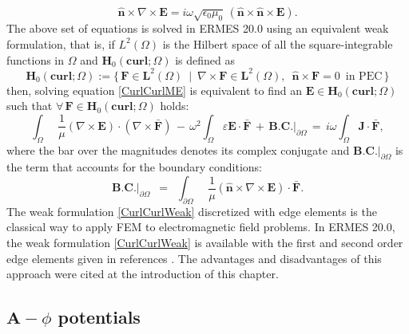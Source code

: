 \begin{equation}\label{BC-1stABC}
	\mathbf{\hat{n}}\times\nabla\times\mathbf{E} = i\omega\sqrt{\epsilon_{0}\mu_{0}}\, (\mathbf{\hat{n}}\times\mathbf{\hat{n}}\times\mathbf{E}).
\end{equation}
The above set of equations is solved in ERMES 20.0 using an equivalent weak formulation, that is, if $L^{2}(\Omega)$ is the Hilbert space of all the square-integrable functions in $\Omega$ and $\mathbf{H}_{0}(\mathbf{curl};\Omega)$ is defined as
\begin{equation}\label{HCurl}
	\mathbf{H}_{0}(\mathbf{curl};\Omega) := \{\,\mathbf{F}\in \mathbf{L}^{2}(\Omega)\enspace|\enspace\nabla\times \mathbf{F} \in \mathbf{L}^{2}(\Omega),\enspace \mathbf{\hat{n}}\times\mathbf{F} = 0\enspace\text{in PEC}\,\}
\end{equation}
then, solving equation \eqref{CurlCurlME} is equivalent to find an $\mathbf{E} \in \mathbf{H}_{0}(\mathbf{curl};\Omega)$ such
that $\forall\,\mathbf{F} \in \mathbf{H}_{0}(\mathbf{curl};\Omega)$ holds:
\begin{equation}\label{CurlCurlWeak}
	\int_{\Omega}\enspace\frac{1}{\mu}(\nabla\times\mathbf{E})\cdot(\nabla\times\mathbf{\bar{F}})\, - \,\omega^{2}\int_{\Omega}\varepsilon\mathbf{E}\cdot\mathbf{\bar{F}}\, + \,\textbf{B.C.}|_{\partial\Omega}\, = \,i\omega\int_{\Omega}\mathbf{J}\cdot\mathbf{\bar{F}},
\end{equation}
where the bar over the magnitudes denotes its complex conjugate and $\textbf{B.C.}|_{\partial\Omega}$ is the term that accounts for the boundary conditions:
\begin{equation}\label{BCGeneral-WF}
	\textbf{B.C.}|_{\partial\Omega}\enspace = \enspace\int_{\partial\Omega}\enspace\frac{1}{\mu}\left(\mathbf{\hat{n}}\times\nabla\times\mathbf{E}\right)\cdot\mathbf{\bar{F}}.
\end{equation}
The weak formulation \eqref{CurlCurlWeak} discretized with edge elements is the classical way to apply FEM to electromagnetic field problems. In ERMES 20.0, the weak formulation \ref{CurlCurlWeak} is available with the first and second order edge elements given in references \cite{Jin, LuisGarcia}. The advantages and disadvantages of this approach were cited at the introduction of this chapter. 

\subsection{$\textbf{A}-\phi$ potentials}\label{sEdgePotentials}

